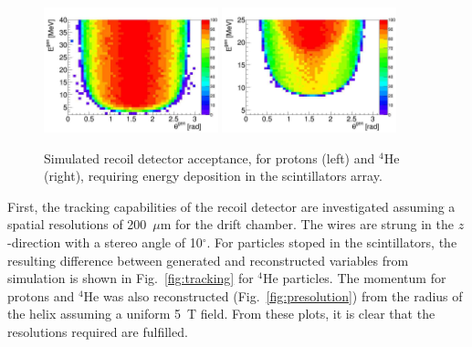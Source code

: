 \begin{figure}[ht!]
    \begin{center}
        \includegraphics[width=0.45\textwidth]{./../Detector/fig-chap2/Bare_3atm_1atm_Proton_Acceptance}
        \includegraphics[width=0.45\textwidth]{./../Detector/fig-chap2/Bare_3atm_1atm_Alpha_Acceptance}
        \caption{Simulated recoil detector acceptance, for protons (left) and $^4$He (right), requiring energy deposition in the scintillators array. \label{fig:acceptance}}
    \end{center}
\end{figure}

First, the tracking capabilities of the recoil detector are investigated assuming a spatial resolutions of 200~$\mu$m for the drift chamber. The wires are strung in the $z$-direction with a stereo angle of 10$^\circ$. For particles stoped in the scintillators, the resulting difference between generated and reconstructed variables from simulation is shown in Fig.~\ref{fig:tracking} for $^4$He particles. The momentum for protons and $^4$He was also reconstructed (Fig.~\ref{fig:presolution}) from the radius of the helix assuming a uniform 5~T field. From these plots, it is clear that the resolutions required are fulfilled. \\

